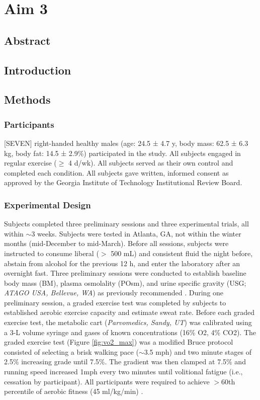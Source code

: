 \chapter{Aim 3}

\section{Abstract}

\section{Introduction}

\section{Methods}

\subsection{Participants}
[SEVEN] right-handed healthy males (age: 24.5 ± 4.7 y, body mass: 62.5 ± 6.3 kg, body fat: 14.5 ± 2.9\%) participated in the study. All subjects engaged in regular exercise (${\geq}$ 4 d/wk). All subjects served as their own control and completed each condition. All subjects gave written, informed consent as approved by the Georgia Institute of Technology Institutional Review Board.

\subsection{Experimental Design}
Subjects completed three preliminary sessions and three experimental trials, all within ${\sim}$3 weeks. Subjects were tested in Atlanta, GA, not within the winter months (mid-December to mid-March). Before all sessions, subjects were instructed to consume liberal ($>$ 500 mL) and consistent fluid the night before, abstain from alcohol for the previous 12 h, and enter the laboratory after an overnight fast. Three preliminary sessions were conducted to establish baseline body mass (BM), plasma osmolality (POsm), and urine specific gravity (USG; \textit{ATAGO USA, Bellevue, WA}) as previously recommended \cite{cheuvront_biological_2010}. During one preliminary session, a graded exercise test was completed by subjects to established aerobic exercise capacity and estimate sweat rate. Before each graded exercise test, the metabolic cart (\textit{Parvomedics, Sandy, UT}) was calibrated using a 3-L volume syringe and gases of known concentrations (16\% O2, 4\% CO2). The graded exercise test (Figure \ref{fig:vo2_max}) was a modified Bruce protocol \cite{american_college_of_sports_medicine_acsms_2013} consisted of selecting a brisk walking pace (${\sim}$3.5 mph) and two minute stages of 2.5\% increasing grade until 7.5\%. The gradient was then clamped at 7.5\% and running speed increased 1mph every two minutes until volitional fatigue (i.e., cessation by participant). All participants were required to achieve $>$60th percentile of aerobic fitness (45 ml/kg/min) \cite{american_college_of_sports_medicine_acsms_2013}.    


